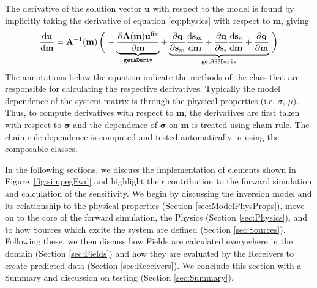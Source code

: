 The derivative of the solution vector $\mathbf{u}$ with respect to the model
is found by implicitly taking the derivative of equation \ref{eq:physics} with
respect to $\mathbf{m}$, giving
\begin{equation}
    \frac{\text{d}\mathbf{u}}{\text{d}\mathbf{m}} = \mathbf{A}^{-1}(\mathbf{m})
    \left(\vphantom{\frac{\partial \mathbf{A}(\mathbf{m}) \mathbf{u^{\text{fix}}}}{\partial \mathbf{m}}
        } \right.
    - \underbrace{\frac{\partial \mathbf{A}(\mathbf{m}) \mathbf{u^{\text{fix}}}}{\partial \mathbf{m}}
        }_{\texttt{getADeriv}}
        +
\underbrace{
         \frac{\partial\mathbf{q}}{\partial\sm} \frac{\text{d} \sm}{\text{d} \mathbf{m}}
        + \frac{\partial\mathbf{q}}{\partial\se} \frac{\text{d} \se}{\text{d} \mathbf{m}}
        + \frac{\partial\mathbf{q}}{\partial\mathbf{m}}
        }_{\texttt{getRHSDeriv}}
    \left. \vphantom{\frac{\text{d}\mathbf{q}}{\text{d}\sm} \frac{\text{d} \sm}{\text{d} \mathbf{m}}
        + \frac{\text{d}\mathbf{q}}{\text{d}\se} \frac{\text{d} \se}{\text{d} \mathbf{m}}
        + \frac{\partial\mathbf{q}}{\partial\mathbf{m}}}
    \right)
\label{eq:dudm}
\end{equation}
The annotations below the equation indicate the methods of the \Problem class
that are responsible for calculating the respective derivatives. Typically the
model dependence of the system matrix is through the physical properties (i.e.
$\sigma$, $\mu$). Thus, to compute derivatives with respect to $\mathbf{m}$,
the derivatives are first taken with respect to $\boldsymbol{\sigma}$ and the dependence of
$\boldsymbol{\sigma}$ on $\mathbf{m}$ is treated using chain rule. The chain
rule dependence is computed and tested automatically in \SimPEG using the
composable \Mapping classes.

In the following sections, we discuss the implementation of
elements shown in Figure~\ref{fig:simpegFwd} and highlight their contribution
to the forward simulation and calculation of the sensitivity. We begin by
discussing the inversion model and its relationship to the physical properties
(Section \ref{sec:ModelPhysProps}), move on to the core of the forward
simulation, the Physics (Section \ref{sec:Physics}), and to how Sources which excite the
system are defined (Section \ref{sec:Sources}). Following these, we then discuss how Fields are
calculated everywhere in the domain (Section \ref{sec:Fields}) and how they are evaluated by the
Receivers to create predicted data (Section \ref{sec:Receivers}). We conclude this section with a
Summary and discussion on testing (Section \ref{sec:Summary}).

